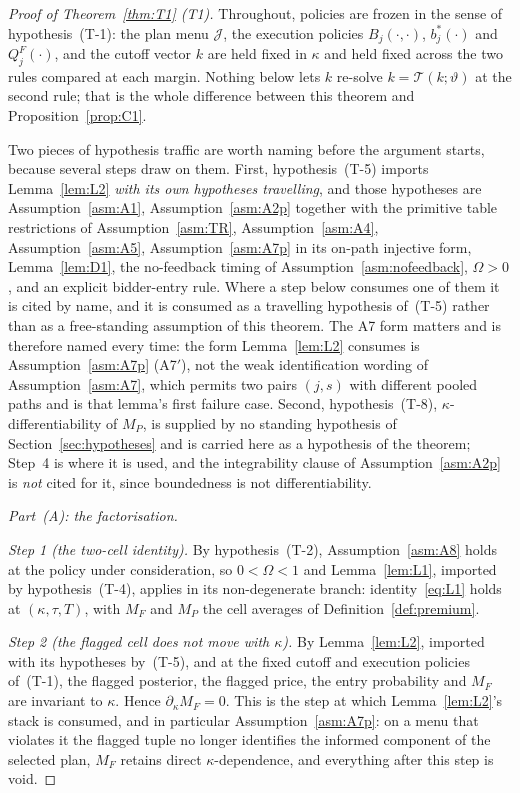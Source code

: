 \documentclass[11pt]{article}
\newcommand{\Tmap}{\mathcal{T}}
\begin{document}
\begin{proof}[Proof of Theorem~\ref{thm:T1} (T1)]
Throughout, policies are frozen in the sense of hypothesis~(T-1): the plan menu $\mathcal J$, the
execution policies $B_j(\cdot,\cdot)$, $b_j^*(\cdot)$ and $Q_j^F(\cdot)$, and the cutoff vector $k$
are held fixed in $\kappa$ and held fixed across the two rules compared at each margin. Nothing
below lets $k$ re-solve $k = \Tmap(k;\vartheta)$ at the second rule; that is the whole difference
between this theorem and Proposition~\ref{prop:C1}.

Two pieces of hypothesis traffic are worth naming before the argument starts, because several steps
draw on them. First, hypothesis~(T-5) imports Lemma~\ref{lem:L2} \emph{with its own hypotheses
travelling}, and those hypotheses are Assumption~\ref{asm:A1}, Assumption~\ref{asm:A2p} together
with the primitive table restrictions of Assumption~\ref{asm:TR}, Assumption~\ref{asm:A4},
Assumption~\ref{asm:A5}, Assumption~\ref{asm:A7p} in its on-path injective form,
Lemma~\ref{lem:D1}, the no-feedback timing of Assumption~\ref{asm:nofeedback}, $\Omega > 0$, and an
explicit bidder-entry rule. Where a step below consumes one of them it is cited by name, and it is
consumed as a travelling hypothesis of~(T-5) rather than as a free-standing assumption of this
theorem. The A7 form matters and is therefore named every time: the form
Lemma~\ref{lem:L2} consumes is Assumption~\ref{asm:A7p} (A7$'$), not the weak identification
wording of Assumption~\ref{asm:A7}, which permits two pairs $(j,s)$ with different pooled paths and
is that lemma's first failure case. Second, hypothesis~(T-8), $\kappa$-differentiability of
$M_P$, is supplied by no standing hypothesis of Section~\ref{sec:hypotheses} and is carried here
as a hypothesis of the theorem; Step~4 is where it is used, and the integrability clause of
Assumption~\ref{asm:A2p} is \emph{not} cited for it, since boundedness is not differentiability.

\medskip
\noindent\emph{Part~(A): the factorisation.}

\emph{Step 1 (the two-cell identity).} By hypothesis~(T-2), Assumption~\ref{asm:A8} holds at the
policy under consideration, so $0 < \Omega < 1$ and Lemma~\ref{lem:L1}, imported by
hypothesis~(T-4), applies in its non-degenerate branch: identity~\eqref{eq:L1} holds at
$(\kappa,\tau,T)$, with $M_F$ and $M_P$ the cell averages of Definition~\ref{def:premium}.

\emph{Step 2 (the flagged cell does not move with $\kappa$).} By Lemma~\ref{lem:L2}, imported with
its hypotheses by~(T-5), and at the fixed cutoff and execution policies of~(T-1), the flagged
posterior, the flagged price, the entry probability and $M_F$ are invariant to $\kappa$. Hence
$\partial_\kappa M_F = 0$. This is the step at which Lemma~\ref{lem:L2}'s stack is consumed, and in
particular Assumption~\ref{asm:A7p}: on a menu that violates it the flagged tuple no longer
identifies the informed component of the selected plan, $M_F$ retains direct $\kappa$-dependence,
and everything after this step is void.


\end{proof}
\end{document}
